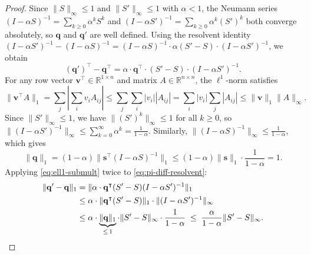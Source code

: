 \documentclass{article}
\theoremstyle{plain}
\theoremstyle{definition}
\newcommand{\norm}[1]{\| #1 \|}
\def\R{\mathbb{R}}
\def\tp{\intercal}
\begin{document}
\begin{proof}%
	Since $\|S\|_\infty \leq 1$ and $\|S'\|_\infty \leq 1$ with $\alpha < 1$,
	the Neumann series $(I-\alpha S)^{-1} = \sum_{k \geq 0}\alpha^k S^k$ and
	$(I-\alpha S')^{-1} = \sum_{k \geq 0}\alpha^k (S')^k$ both converge
	absolutely, so $\mathbf{q}$ and $\mathbf{q}'$ are well defined.
	Using the resolvent identity
	$(I - \alpha S')^{-1} - (I - \alpha S)^{-1}
	= (I - \alpha S)^{-1}\cdot \alpha(S' - S)\cdot (I - \alpha S')^{-1}$,
	we obtain
	\begin{equation}\label{eq:pi-diff-resolvent}
		(\mathbf{q}')^\tp - \mathbf{q}^\tp
		= \alpha \cdot \mathbf{q}^\tp \cdot (S' - S) \cdot (I - \alpha S')^{-1}.
	\end{equation}
	For any row vector $\mathbf{v}^\tp \in \R^{1 \times n}$ and matrix
	$A \in \R^{n \times n}$, the $\ell^1$-norm satisfies
	\begin{equation}\label{eq:ell1-submult}
		\norm{\mathbf{v}^\tp A}_1
		= \sum_j \left|\sum_i v_i A_{ij}\right|
		\leq \sum_j \sum_i |v_i| |A_{ij}|
		= \sum_i |v_i| \sum_j |A_{ij}|
		\leq \norm{\mathbf{v}}_1 \norm{A}_\infty.
	\end{equation}
	Since $\|S'\|_\infty \leq 1$, we have $\|(S')^k\|_\infty \leq 1$
	for all $k \geq 0$, so
	$\norm{(I - \alpha S')^{-1}}_\infty \leq \sum_{k=0}^\infty \alpha^k
	= \frac{1}{1-\alpha}$.
	Similarly, $\|(I-\alpha S)^{-1}\|_\infty \leq \frac{1}{1-\alpha}$,
	which gives
	\[
	\|\mathbf{q}\|_1
	= (1-\alpha)\|\mathbf{s}^\tp(I-\alpha S)^{-1}\|_1
	\leq (1-\alpha)\|\mathbf{s}\|_1 \cdot \frac{1}{1-\alpha} = 1.
	\]
	Applying \eqref{eq:ell1-submult} twice to \eqref{eq:pi-diff-resolvent}:
	\begin{align*}
		\norm{\mathbf{q}' - \mathbf{q}}_1
		&= \norm{\alpha \cdot \mathbf{q}^\tp(S' - S)(I - \alpha S')^{-1}}_1 \\
		&\leq \alpha \cdot \norm{\mathbf{q}^\tp(S'-S)}_1
		\cdot \norm{(I-\alpha S')^{-1}}_\infty \\
		&\leq \alpha \cdot \underbrace{\norm{\mathbf{q}}_1}_{\leq\,1}
		\cdot \norm{S' - S}_\infty \cdot \frac{1}{1-\alpha}
		\;\leq\; \frac{\alpha}{1-\alpha}\norm{S'-S}_\infty. \qedhere
	\end{align*}
\end{proof}
\end{document}
